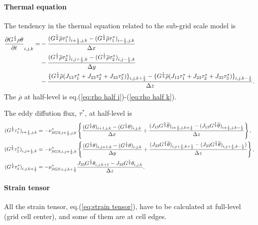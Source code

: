 \paragraph{Thermal equation}
The tendency in the thermal equation related to the sub-grid scale model is
\begin{align}
  \frac{\partial G^{\frac{1}{2}}\rho \theta}{\partial t}_{i,j,k} =
  &- \frac{(G^{\frac{1}{2}}\overline{\rho}\tau^*_1)_{i+\half,j,k}-(G^{\frac{1}{2}}\overline{\rho}\tau^*_1)_{i-\half,j,k}}{\Delta x} \nonumber \\
  &- \frac{(G^{\frac{1}{2}}\overline{\rho}\tau^*_2)_{i,j+\half,k}-(G^{\frac{1}{2}}\overline{\rho}\tau^*_2)_{i,j-\half,k}}{\Delta y} \nonumber \\
  &- \frac{\{G^{\frac{1}{2}}\overline{\rho}(J_{13}\tau^*_1+J_{23}\tau^*_2+J_{33}\tau^*_3)\}_{i,j,k+\half}
          -\{G^{\frac{1}{2}}\overline{\rho}(J_{13}\tau^*_1+J_{23}\tau^*_2+J_{33}\tau^*_3)\}_{i,j,k-\half}}{\Delta z}.
\end{align}
The $\overline{\rho}$ at half-level is eq.(\ref{eq:rho half i})-(\ref{eq:rho half k}).

The eddy diffution flux, $\tau^*$, at half-level
is
\begin{align}
  (G^{\frac{1}{2}}\tau^*_1)_{i+\half,j,k} &= -\nu^*_{SGS,i+\half,j,k} \left\{
  \frac{(G^{\frac{1}{2}}\theta)_{i+1,j,k}-(G^{\frac{1}{2}}\theta)_{i,j,k}}{\Delta x}
  + \frac{(J_{13}G^{\frac{1}{2}}\overline{\theta})_{i+\half,j,k+\half}-(J_{13}G^{\frac{1}{2}}\overline{\theta})_{i+\half,j,k-\half}}{\Delta z} \right\}, \\
  (G^{\frac{1}{2}}\tau^*_2)_{i,j+\half,k} &= -\nu^*_{SGS,i,j+\half,k} \left\{
  \frac{(G^{\frac{1}{2}}\theta)_{i,j+1,k}-(G^{\frac{1}{2}}\theta)_{i,j,k}}{\Delta y}
  + \frac{(J_{23}G^{\frac{1}{2}}\overline{\theta})_{i,j+\half,k+\half}-(J_{23}G^{\frac{1}{2}}\overline{\theta})_{i,j+\half,k-\half})}{\Delta z} \right\}, \\
  (G^{\frac{1}{2}}\tau^*_3)_{i,j,k+\half} &= -\nu^*_{SGS,i,j,k+\half} \frac{J_{33}G^{\frac{1}{2}}\theta_{i,j,k+1}-J_{33}G^{\frac{1}{2}}\theta_{i,j,k}}{\Delta z}.
\end{align}



\paragraph{Strain tensor}
All the strain tensor, eq.(\ref{eq:strain tensor}), have to be calculated
at full-level (grid cell center),
and some of them are at cell edges.

